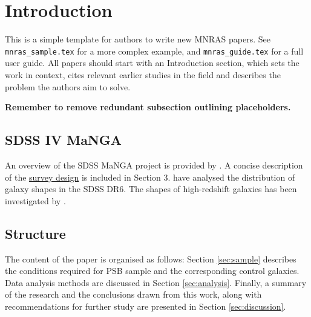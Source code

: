\section{Introduction}
\label{sec:introduction}

\par This is a simple template for authors to write new MNRAS papers.
See \texttt{mnras\_sample.tex} for a more complex example, and \texttt{mnras\_guide.tex}
for a full user guide. All papers should start with an Introduction section, which sets the work in context, cites relevant earlier studies in the field and describes the problem the authors aim to solve.

\vspace{10pt}
\textbf{Remember to remove redundant subsection outlining placeholders.}

\subsection{SDSS IV MaNGA}
An overview of the SDSS MaNGA project is provided by \citet{2015ApJ...798....7B}. A concise description of the \href{https://iopscience.iop.org/article/10.1088/0004-637X/798/1/7/meta#apj504473s3}{survey design} is included in Section 3. \citet{2008MNRAS.388.1321P} have analysed the distribution of galaxy shapes in the SDSS DR6. The shapes of high-redshift galaxies has been investigated by \citet{2012ApJ...754L..24C}.



\subsection{Structure}
The content of the paper is organised as follows: Section \ref{sec:sample} describes the conditions required for PSB sample and the corresponding control galaxies. Data analysis methods are discussed in Section \ref{sec:analysis}. Finally, a summary of the research and the conclusions drawn from this work, along with recommendations for further study are presented in Section \ref{sec:discussion}.
